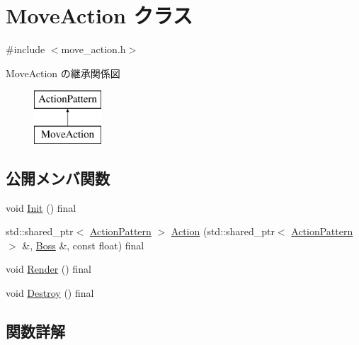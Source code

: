 \hypertarget{class_move_action}{}\section{Move\+Action クラス}
\label{class_move_action}


{\ttfamily \#include $<$move\+\_\+action.\+h$>$}

Move\+Action の継承関係図\begin{figure}[H]
\begin{center}
\leavevmode
\includegraphics[height=2.000000cm]{class_move_action}
\end{center}
\end{figure}
\subsection*{公開メンバ関数}
\begin{DoxyCompactItemize}
\item 
void \mbox{\hyperlink{class_move_action_a0861a4a0fcbab38f8c33ed02b9f3c1b8}{Init}} () final
\item 
std\+::shared\+\_\+ptr$<$ \mbox{\hyperlink{class_action_pattern}{Action\+Pattern}} $>$ \mbox{\hyperlink{class_move_action_aa731fa679786c8c61965dfcd258c6c66}{Action}} (std\+::shared\+\_\+ptr$<$ \mbox{\hyperlink{class_action_pattern}{Action\+Pattern}} $>$ \&, \mbox{\hyperlink{class_boss}{Boss}} \&, const float) final
\item 
void \mbox{\hyperlink{class_move_action_a3f427440c2409e0633ff0f6040a0320c}{Render}} () final
\item 
void \mbox{\hyperlink{class_move_action_a48727a426f2a69ed62631af8385ff6ef}{Destroy}} () final
\end{DoxyCompactItemize}


\subsection{関数詳解}
\mbox{\label{class_move_action_aa731fa679786c8c61965dfcd258c6c66}} 
